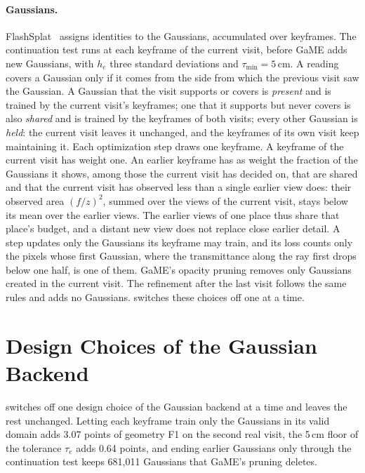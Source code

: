 \paragraph{Gaussians.}
FlashSplat~\cite{shen2024flashsplat} assigns identities to the Gaussians, accumulated over keyframes. The continuation
test runs at each keyframe of the current visit, before GaME adds new Gaussians, with $h_e$ three standard deviations and
$\tau_{\min} = 5$\,cm. A reading covers a Gaussian only if it comes from the side from which the
previous visit saw the Gaussian. A Gaussian that the visit supports or covers is \emph{present} and is trained by the
current visit's keyframes; one that it supports but never covers is also \emph{shared} and is trained by the keyframes of
both visits; every other Gaussian is \emph{held}: the current visit leaves it unchanged, and the keyframes of its own visit
keep maintaining it. Each optimization step draws one keyframe. A keyframe of the current visit has weight one. An
earlier keyframe has as weight the fraction of the Gaussians it shows, among those the current visit has decided on, that
are shared and that the current visit has observed less than a single earlier view does: their observed area $(f/z)^2$,
summed over the views of the current visit, stays below its mean over the earlier views. The earlier views of one place
thus share that place's budget, and a distant new view does not replace close earlier detail. A step updates only the
Gaussians its keyframe may train, and its loss counts only the pixels whose first Gaussian, where the transmittance
along the ray first drops below one half, is one of them. GaME's opacity pruning removes only Gaussians created in the
current visit. The refinement after the last visit follows the same rules and adds no Gaussians. 
switches these choices off one at a time.


\section{Design Choices of the Gaussian Backend}
\label{sec:supp_gaussian}

 switches off one design choice of the Gaussian backend at a time and leaves the rest
unchanged. Letting each keyframe train only the Gaussians in its valid domain adds 3.07 points of geometry F1 on the second real visit, the 5\,cm
floor of the tolerance $\tau_e$ adds 0.64 points, and ending earlier Gaussians only
through the continuation test keeps 681{,}011 Gaussians that GaME's pruning deletes.

